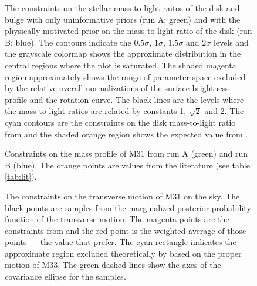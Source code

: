 \documentclass[preprint]{aastex}
\newcommand{\figlabel}[1]{\label{fig:#1}}
\newcommand{\tab}[1]{table \ref{tab:#1}}
\begin{document}

\clearpage

\begin{figure}[tbp]
    \caption{The constraints on the stellar mass-to-light raitos of the disk
        and bulge with only uninformative priors (run A; green) and with the
        physically motivated prior on the mass-to-light ratio of the disk
        (run B; blue). The contours indicate the
        $0.5\sigma$, $1\sigma$, $1.5\sigma$ and $2\sigma$ levels and the
        grayscale colormap shows the approximate distribution in the central
        regions where the plot is saturated. The shaded magenta region
        approximately shows the range of parameter space excluded by the
        relative overall normalizations of the surface brightness profile
        and the rotation curve.
        The black lines are the levels where the mass-to-light ratios are
        related by constants 1, $\sqrt{2}$ and 2.
        The cyan contours are the constraints on the disk mass-to-light
        ratio from \citet{Bell:2003} and the shaded orange region shows the
        expected value from \citet{Courteau:1999a}.
        \figlabel{m2l}}
\end{figure}

\begin{figure}[tbp]
    \caption{Constraints on the mass profile of M31 from run A (green) and
    run B (blue). The orange points are values from the literature (see
    \tab{lit}).
    \figlabel{mass-profile}}
\end{figure}

\begin{figure}[tbp]
    \caption{\figlabel{m300}}
\end{figure}

\begin{figure}[tbp]
    \caption{The constraints on the transverse motion of M31 on the sky. The
        black points are samples from the marginalized posterior probability
        function of the transverse motion.
        The magenta points are the constraints from \citet{vdm} and the red
        point is the weighted average of those points --- the value that
        \citet{vdm} prefer. The cyan rectangle indicates the approximate
        region excluded theoretically by \citet{Loeb:2005} based on the
        proper motion of M33. The green dashed lines show the axes of the
        covariance ellipse for the samples. \figlabel{vt}}
\end{figure}
\end{document}
